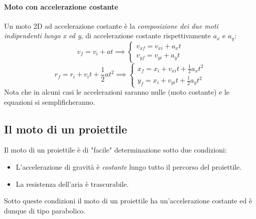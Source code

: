 \documentclass[12pt, a4paper, openany]{book}
\begin{document}
\paragraph*{Moto con accelerazione costante}
Un moto 2D ad accelerazione costante è la \emph{composizione dei due moti indipendenti lungo x ed y}, di accelerazione costante rispettivamente $a_x$ e $a_y$:
$$ v_f = v_i + at \implies \begin{cases}
        v_{xf} = v_{xi} +a_xt \\
        v_{yf} = v_{yi} +a_yt
    \end{cases}
$$
$$ r_f = r_i + v_it + \frac{1}{2}at^2 \implies \begin{cases}
        x_f = x_i + v_{xi}t + \frac{1}{2}a_xt^2 \\
        y_f = x_i + v_{yi}t + \frac{1}{2}a_yt^2
    \end{cases}$$
Nota che in alcuni casi le accelerazioni saranno nulle (moto costante) e le equazioni si semplificheranno.

\subsection{Il moto di un proiettile}
Il moto di un proiettile è di "facile" determinazione sotto due condizioni:
\begin{itemize}
    \item L'accelerazione di gravità è \emph{costante} lungo tutto il percorso del proiettile.
    \item La resistenza dell'aria è trascurabile.
\end{itemize}
Sotto queste condizioni il moto di un proiettile ha un'accelerazione costante ed è dunque di tipo parabolico.
\end{document}
